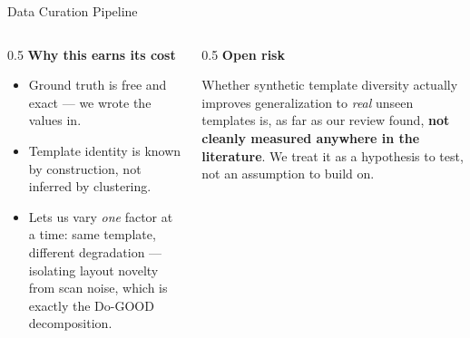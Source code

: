 \documentclass[aspectratio=169, 11pt]{beamer}
\begin{document}
\begin{frame}{Data Curation Pipeline}
  \begin{center}
  \end{center}

  \medskip
  \begin{columns}[T]
    \begin{column}{0.5\textwidth}
      \textbf{Why this earns its cost}
      \begin{itemize}\small
        \item Ground truth is free and exact — we wrote the values in.
        \item Template identity is known by construction, not inferred by clustering.
        \item Lets us vary \emph{one} factor at a time: same template, different degradation — isolating layout novelty from scan noise, which is exactly the Do-GOOD decomposition.
      \end{itemize}
    \end{column}
    \begin{column}{0.5\textwidth}
      \textbf{Open risk}
      \smallskip

      {\footnotesize Whether synthetic template diversity actually improves generalization to
      \emph{real} unseen templates is, as far as our review found, \textbf{not cleanly measured
      anywhere in the literature}. We treat it as a hypothesis to test, not an assumption to
      build on.}
    \end{column}
  \end{columns}
\end{frame}
\end{document}
